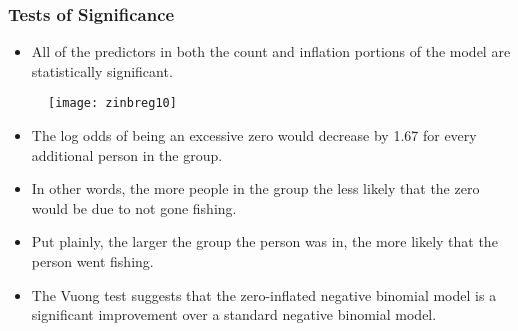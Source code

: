 \documentclass[MASTER.tex]{subfiles}
\begin{document}
\begin{frame}[fragile]
\frametitle{Tests of Significance}
\large
\begin{itemize}
\item	All of the predictors in both the count and inflation portions of the model are statistically significant. 
\end{itemize}	

\end{frame}
%	
%	
%	
\begin{frame}
	\begin{figure}
		\centering
		\texttt{[image: zinbreg10]}
		
	\end{figure}
	
	
\end{frame}
\begin{frame}
	\large
	\begin{itemize}
		\item The log odds of being an excessive zero would decrease by 1.67 for every additional person in the group. 
		\item In other words, the more people in the group the less likely that the zero would be due to not gone fishing. 
		\item Put plainly, the larger the group the person was in, the more likely that the person went fishing.
		\item The Vuong test suggests that the zero-inflated negative binomial model is a significant improvement over a standard negative binomial model. 
	\end{itemize}
\end{frame}
\end{document}
